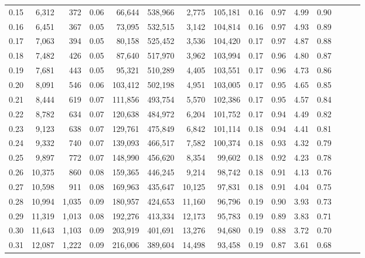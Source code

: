 \begin{tabular}{rrrrrrrrrrrrrrr}
0.15 &   6,312 &    372 &  0.06 &   66,644 &  538,966 &    2,775 &  105,181 &  0.16 &  0.97 &  4.99 &      0.90 \\
0.16 &   6,451 &    367 &  0.05 &   73,095 &  532,515 &    3,142 &  104,814 &  0.16 &  0.97 &  4.93 &      0.89 \\
0.17 &   7,063 &    394 &  0.05 &   80,158 &  525,452 &    3,536 &  104,420 &  0.17 &  0.97 &  4.87 &      0.88 \\
0.18 &   7,482 &    426 &  0.05 &   87,640 &  517,970 &    3,962 &  103,994 &  0.17 &  0.96 &  4.80 &      0.87 \\
0.19 &   7,681 &    443 &  0.05 &   95,321 &  510,289 &    4,405 &  103,551 &  0.17 &  0.96 &  4.73 &      0.86 \\
0.20 &   8,091 &    546 &  0.06 &  103,412 &  502,198 &    4,951 &  103,005 &  0.17 &  0.95 &  4.65 &      0.85 \\
0.21 &   8,444 &    619 &  0.07 &  111,856 &  493,754 &    5,570 &  102,386 &  0.17 &  0.95 &  4.57 &      0.84 \\
0.22 &   8,782 &    634 &  0.07 &  120,638 &  484,972 &    6,204 &  101,752 &  0.17 &  0.94 &  4.49 &      0.82 \\
0.23 &   9,123 &    638 &  0.07 &  129,761 &  475,849 &    6,842 &  101,114 &  0.18 &  0.94 &  4.41 &      0.81 \\
0.24 &   9,332 &    740 &  0.07 &  139,093 &  466,517 &    7,582 &  100,374 &  0.18 &  0.93 &  4.32 &      0.79 \\
0.25 &   9,897 &    772 &  0.07 &  148,990 &  456,620 &    8,354 &   99,602 &  0.18 &  0.92 &  4.23 &      0.78 \\
0.26 &  10,375 &    860 &  0.08 &  159,365 &  446,245 &    9,214 &   98,742 &  0.18 &  0.91 &  4.13 &      0.76 \\
0.27 &  10,598 &    911 &  0.08 &  169,963 &  435,647 &   10,125 &   97,831 &  0.18 &  0.91 &  4.04 &      0.75 \\
0.28 &  10,994 &  1,035 &  0.09 &  180,957 &  424,653 &   11,160 &   96,796 &  0.19 &  0.90 &  3.93 &      0.73 \\
0.29 &  11,319 &  1,013 &  0.08 &  192,276 &  413,334 &   12,173 &   95,783 &  0.19 &  0.89 &  3.83 &      0.71 \\
0.30 &  11,643 &  1,103 &  0.09 &  203,919 &  401,691 &   13,276 &   94,680 &  0.19 &  0.88 &  3.72 &      0.70 \\
0.31 &  12,087 &  1,222 &  0.09 &  216,006 &  389,604 &   14,498 &   93,458 &  0.19 &  0.87 &  3.61 &      0.68 \\

\end{tabular}
